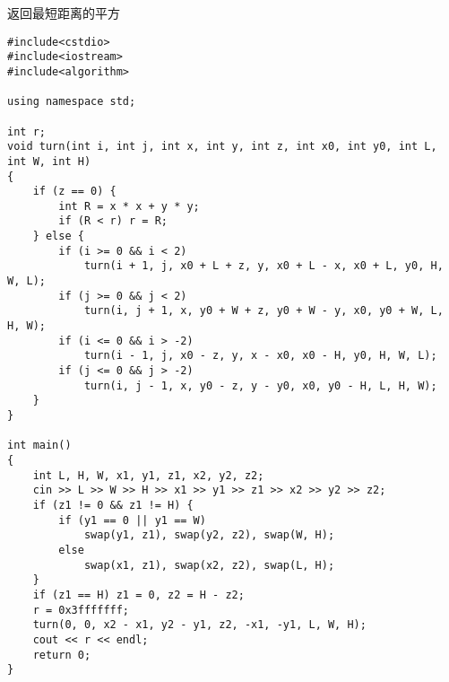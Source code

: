 返回最短距离的平方
\begin{lstlisting}
#include<cstdio>
#include<iostream>
#include<algorithm>

using namespace std;

int r;
void turn(int i, int j, int x, int y, int z, int x0, int y0, int L, int W, int H)
{
	if (z == 0) {
		int R = x * x + y * y;
		if (R < r) r = R;
	} else {
		if (i >= 0 && i < 2)
			turn(i + 1, j, x0 + L + z, y, x0 + L - x, x0 + L, y0, H, W, L);
		if (j >= 0 && j < 2)
			turn(i, j + 1, x, y0 + W + z, y0 + W - y, x0, y0 + W, L, H, W);
		if (i <= 0 && i > -2)
			turn(i - 1, j, x0 - z, y, x - x0, x0 - H, y0, H, W, L);
		if (j <= 0 && j > -2)
			turn(i, j - 1, x, y0 - z, y - y0, x0, y0 - H, L, H, W);
	}
}

int main()
{
	int L, H, W, x1, y1, z1, x2, y2, z2;
	cin >> L >> W >> H >> x1 >> y1 >> z1 >> x2 >> y2 >> z2;
	if (z1 != 0 && z1 != H) {
		if (y1 == 0 || y1 == W)
			swap(y1, z1), swap(y2, z2), swap(W, H);
		else
			swap(x1, z1), swap(x2, z2), swap(L, H);
	}
	if (z1 == H) z1 = 0, z2 = H - z2;
	r = 0x3fffffff; 
	turn(0, 0, x2 - x1, y2 - y1, z2, -x1, -y1, L, W, H);
	cout << r << endl;
	return 0;
}
\end{lstlisting}
